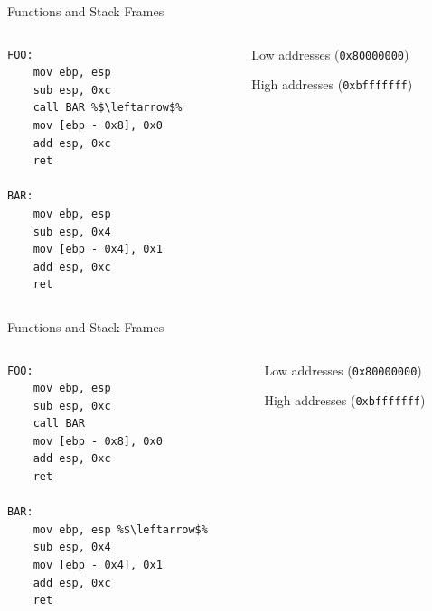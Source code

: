 \documentclass[]{beamer}
\begin{document}
\begin{frame}[fragile]{Functions and Stack Frames}
  \begin{columns}
    \begin{column}{0.45\linewidth}
      \begin{lstlisting}[language={[x86masm]Assembler}, escapechar=\%]
FOO:
    mov ebp, esp 
    sub esp, 0xc 
    call BAR %$\leftarrow$%
    mov [ebp - 0x8], 0x0 
    add esp, 0xc 
    ret

BAR:
    mov ebp, esp
    sub esp, 0x4
    mov [ebp - 0x4], 0x1
    add esp, 0xc
    ret
      \end{lstlisting}
    \end{column}
    \begin{column}{0.4\linewidth}
      \par
      {\scriptsize Low addresses ({\tt 0x80000000})}\\[.5em]
      {\scriptsize High addresses ({\tt 0xbfffffff})}
    \end{column}
  \end{columns}
\end{frame}

\begin{frame}[fragile]{Functions and Stack Frames}
  \begin{columns}
    \begin{column}{0.45\linewidth}
      \begin{lstlisting}[language={[x86masm]Assembler}, escapechar=\%]
FOO:
    mov ebp, esp 
    sub esp, 0xc 
    call BAR 
    mov [ebp - 0x8], 0x0 
    add esp, 0xc 
    ret

BAR:
    mov ebp, esp %$\leftarrow$%
    sub esp, 0x4
    mov [ebp - 0x4], 0x1
    add esp, 0xc
    ret
      \end{lstlisting}
    \end{column}
    \begin{column}{0.4\linewidth}
      \par
      {\scriptsize Low addresses ({\tt 0x80000000})}\\[.5em]
      {\scriptsize High addresses ({\tt 0xbfffffff})}
    \end{column}
  \end{columns}
\end{frame}
\end{document}
